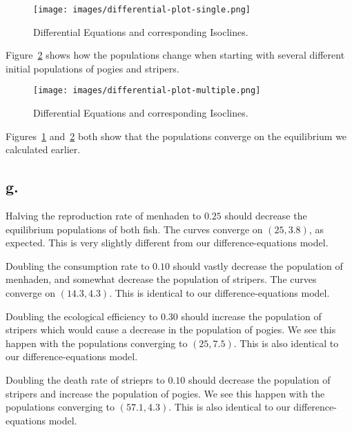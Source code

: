 \begin{figure}[ht!]
    \centering
    \texttt{[image: images/differential-plot-single.png]}
    \caption{Differential Equations and corresponding Isoclines.}
    \label{figure:differential-single}
\end{figure}

Figure~\ref{figure:differential-multiple} shows how the populations change when starting with several different initial populations of pogies and stripers.

\begin{figure}[ht!]
    \centering
    \texttt{[image: images/differential-plot-multiple.png]}
    \caption{Differential Equations and corresponding Isoclines.}
    \label{figure:differential-multiple}
\end{figure}

Figures~\ref{figure:differential-single} and~\ref{figure:differential-multiple} both show that the populations converge on the equilibrium we calculated earlier.


\subsection*{g.}

Halving the reproduction rate of menhaden to $0.25$ should decrease the equilibrium populations of both fish.
The curves converge on $(25, 3.8)$, as expected.
This is very slightly different from our difference-equations model.

Doubling the consumption rate to $0.10$ should vastly decrease the population of menhaden, and somewhat decrease the population of stripers.
The curves converge on $(14.3, 4.3)$.
This is identical to our difference-equations model.

Doubling the ecological efficiency to $0.30$ should increase the population of stripers which would cause a decrease in the population of pogies.
We see this happen with the populations converging to $(25, 7.5)$.
This is also identical to our difference-equations model.

Doubling the death rate of strieprs to $0.10$ should decrease the population of stripers and increase the population of pogies.
We see this happen with the populations converging to $(57.1, 4.3)$.
This is also identical to our difference-equations model.
